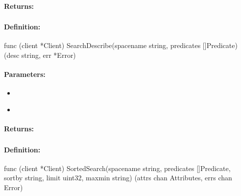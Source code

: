 \paragraph{Returns:}


\pagebreak
\subsubsection{}
\label{api:Go:SearchDescribe}


\paragraph{Definition:}
\begin{gocode}
func (client *Client) SearchDescribe(spacename string, predicates []Predicate) (desc string, err *Error)
\end{gocode}

\paragraph{Parameters:}
\begin{itemize}[noitemsep]
\item {}\\

\item {}\\

\end{itemize}

\paragraph{Returns:}


\pagebreak
\subsubsection{}
\label{api:Go:SortedSearch}


\paragraph{Definition:}
\begin{gocode}
func (client *Client) SortedSearch(spacename string, predicates []Predicate, sortby string, limit uint32, maxmin string) (attrs chan Attributes, errs chan Error)
\end{gocode}

